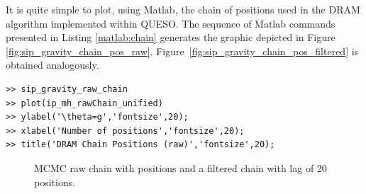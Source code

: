 It is quite simple to plot, using Matlab, the chain of positions used in the DRAM algorithm implemented within QUESO. 
The sequence of Matlab commands presented in Listing \ref{matlab:chain} generates the graphic depicted in Figure \ref{fig:sip_gravity_chain_pos_raw}.
Figure~\ref{fig:sip_gravity_chain_pos_filtered} is obtained analogously. %

\begin{lstlisting}[label=matlab:chain,caption={Matlab code for the chain plot.}]
% inside Matlab
>> sip_gravity_raw_chain
>> plot(ip_mh_rawChain_unified)
>> ylabel('\theta=g','fontsize',20);
>> xlabel('Number of positions','fontsize',20);
>> title('DRAM Chain Positions (raw)','fontsize',20);
\end{lstlisting}

\begin{figure}[htb]
\centering 
{}
\vspace*{-10pt}
\caption{MCMC raw chain with \chainsizeresults{} positions and a filtered chain with lag of 20 positions.}
\end{figure}

